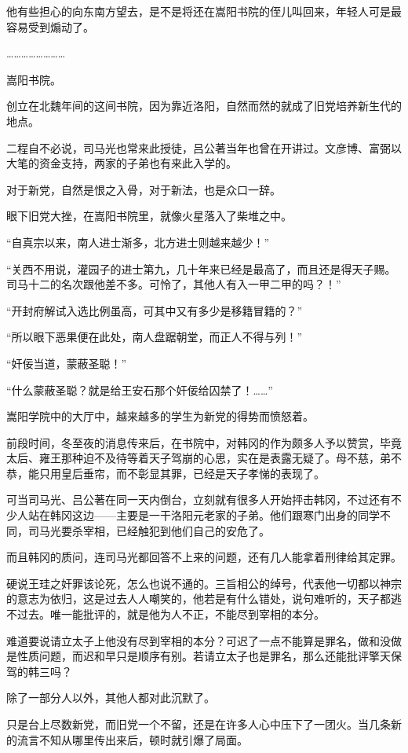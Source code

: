他有些担心的向东南方望去，是不是将还在嵩阳书院的侄儿叫回来，年轻人可是最容易受到煽动了。

……………………

嵩阳书院。

创立在北魏年间的这间书院，因为靠近洛阳，自然而然的就成了旧党培养新生代的地点。

二程自不必说，司马光也常来此授徒，吕公著当年也曾在开讲过。文彦博、富弼以大笔的资金支持，两家的子弟也有来此入学的。

对于新党，自然是恨之入骨，对于新法，也是众口一辞。

眼下旧党大挫，在嵩阳书院里，就像火星落入了柴堆之中。

“自真宗以来，南人进士渐多，北方进士则越来越少！”

“关西不用说，灌园子的进士第九，几十年来已经是最高了，而且还是得天子赐。司马十二的名次跟他差不多。可怜了，其他人有入一甲二甲的吗？！”

“开封府解试入选比例虽高，可其中又有多少是移籍冒籍的？”

“所以眼下恶果便在此处，南人盘踞朝堂，而正人不得与列！”

“奸佞当道，蒙蔽圣聪！”

“什么蒙蔽圣聪？就是给王安石那个奸佞给囚禁了！……”

嵩阳学院中的大厅中，越来越多的学生为新党的得势而愤怒着。

前段时间，冬至夜的消息传来后，在书院中，对韩冈的作为颇多人予以赞赏，毕竟太后、雍王那种迫不及待等着天子驾崩的心思，实在是表露无疑了。母不慈，弟不恭，能只用皇后垂帘，而不彰显其罪，已经是天子孝悌的表现了。

可当司马光、吕公著在同一天内倒台，立刻就有很多人开始抨击韩冈，不过还有不少人站在韩冈这边——主要是一干洛阳元老家的子弟。他们跟寒门出身的同学不同，司马光要杀宰相，已经触犯到他们自己的安危了。

而且韩冈的质问，连司马光都回答不上来的问题，还有几人能拿着刑律给其定罪。

硬说王珪之奸罪该论死，怎么也说不通的。三旨相公的绰号，代表他一切都以神宗的意志为依归，这是过去人人嘲笑的，他若是有什么错处，说句难听的，天子都逃不过去。唯一能批评的，就是他为人不正，不能尽到宰相的本分。

难道要说请立太子上他没有尽到宰相的本分？可迟了一点不能算是罪名，做和没做是性质问题，而迟和早只是顺序有别。若请立太子也是罪名，那么还能批评擎天保驾的韩三吗？

除了一部分人以外，其他人都对此沉默了。

只是台上尽数新党，而旧党一个不留，还是在许多人心中压下了一团火。当几条新的流言不知从哪里传出来后，顿时就引爆了局面。

